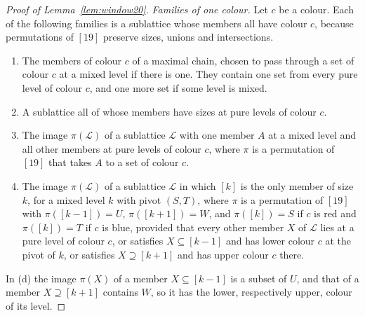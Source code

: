 \documentclass[11pt,reqno]{amsart}
\numberwithin{equation}{section}
\theoremstyle{plain}
\theoremstyle{definition}
\theoremstyle{remark}
\newcommand{\cL}{\mathcal{L}}
\begin{document}
\begin{proof}[Proof of Lemma~\ref{lem:window20}]
\emph{Families of one colour.} Let $c$ be a colour. Each of the following
families is a sublattice whose members all have colour $c$, because
permutations of $[19]$ preserve sizes, unions and intersections.
\begin{enumerate}[label=\textup{(\alph*)},leftmargin=2em]
\item The members of colour $c$ of a maximal chain, chosen to pass
through a set of colour $c$ at a mixed level if there is one. They
contain one set from every pure level of colour $c$, and one more set if
some level is mixed.
\item A sublattice all of whose members have sizes at pure levels of
colour $c$.
\item The image $\pi(\cL)$ of a sublattice $\cL$ with one member $A$ at a
mixed level and all other members at pure levels of colour $c$, where
$\pi$ is a permutation of $[19]$ that takes $A$ to a set of colour $c$.
\item The image $\pi(\cL)$ of a sublattice $\cL$ in which $[k]$ is the
only member of size $k$, for a mixed level $k$ with pivot $(S,T)$, where
$\pi$ is a permutation of $[19]$ with $\pi([k-1])=U$, $\pi([k+1])=W$, and
$\pi([k])=S$ if $c$ is red and $\pi([k])=T$ if $c$ is blue, provided that
every other member $X$ of $\cL$ lies at a pure level of colour $c$, or
satisfies $X\subseteq[k-1]$ and has lower colour $c$ at the pivot of $k$,
or satisfies $X\supseteq[k+1]$ and has upper colour $c$ there.
\end{enumerate}
In (d) the image $\pi(X)$ of a member $X\subseteq[k-1]$ is a subset of
$U$, and that of a member $X\supseteq[k+1]$ contains $W$, so it has the
lower, respectively upper, colour of its level.


\end{proof}
\end{document}
